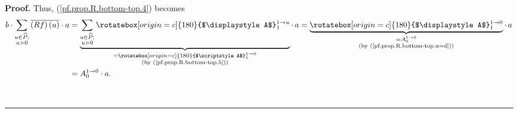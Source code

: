 \documentclass[numbers=enddot,12pt,final,onecolumn,notitlepage]{scrartcl}%
\theoremstyle{definition}
\newenvironment{verlong}{}{}
\newcommand{\upslack}{\mathchoice{\rotatebox[origin=c]{180}{$\displaystyle A$}}{\rotatebox[origin=c]{180}{$\textstyle A$}}{\rotatebox[origin=c]{180}{$\scriptstyle A$}}{\rotatebox[origin=c]{180}{$\scriptscriptstyle A$}}}
\newcommand{\downslack}{A}
\newenvironment{proof}[1][Proof]{\noindent\textbf{#1.} }{\ \rule{0.5em}{0.5em}}
\let\sumnonlimits\sum
\renewcommand{\sum}{\sumnonlimits\limits}
\begin{document}
\begin{verlong}
\begin{proof}
Thus, (\ref{pf.prop.R.bottom-top.4}) becomes%
\begin{align}
b\cdot\sum_{\substack{u\in\widehat{P};\\u\gtrdot0}}\overline{\left(
Rf\right)  \left(  u\right)  }\cdot a  &  =\underbrace{\sum_{\substack{u\in
\widehat{P};\\u\gtrdot0}}\upslack_{1}^{1\rightarrow u}}%
_{\substack{=\upslack_{1}^{1\rightarrow0}\\\text{(by
(\ref{pf.prop.R.bottom-top.5}))}}}\cdot\, a=\underbrace{\upslack_{1}%
^{1\rightarrow0}}_{\substack{=\downslack_{0}^{1\rightarrow0}\\\text{(by
(\ref{pf.prop.R.bottom-top.u=d}))}}}\cdot\, a\nonumber\\
&  =\downslack_{0}^{1\rightarrow0}\cdot a. \label{pf.prop.R.bottom-top.6}%
\end{align}



\end{proof}
\end{verlong}
\end{document}
